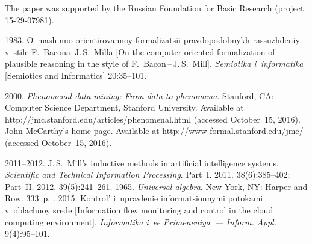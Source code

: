 

\vspace*{-12pt}

\Ack
\noindent
The paper was supported by the Russian Foundation for Basic Research (project 15-29-07981).




  \begin{multicols}{2}

\renewcommand{\bibname}{\protect\rmfamily References}

{\small\frenchspacing
 {%
 \begin{thebibliography}{9}
 
   1983. O~mashinno-orientirovannoy for\-ma\-li\-za\-tsii 
pravdopodobnykh rassuzhdeniy v~stile F.~Bacona--J.\,S.~Milla [On the  
computer-oriented formalization of plausible reasoning in the style of  
F.~Bacon\,--\,J.\,S.~Mill]. \textit{Semiotika i~informatika} [Semiotics and 
Informatics] 20:35--101.


   2000. \textit{Phenomenal data mining: From data to 
phenomena}.  Stanford, CA: Computer Science Department, Stanford University.  
 Available at {\sf 
http://jmc.\linebreak stanford.edu/articles/phenomenal.html} (accessed October~15, 2016). 
   John McCarthy's home page. Available at {\sf 
   http://www-formal.stanford.edu/jmc/} (accessed October~15, 2016). 
  
   2011--2012. J.\,S.~Mill's inductive methods in artificial 
intelligence systems. \textit{Scientific and Technical Information Processing}. 
Part~I. 2011. 38(6):385--402; Part~II. 2012. 39(5):241--261.
   1965. \textit{Universal algebra}.  New York, NY: 
Harper and Row. 333~p.
  . 2015. Kontrol'
i~upravlenie informatsionnymi potokami v~oblachnoy srede [Information flow 
monitoring and control in the cloud computing environment]. \textit{Informatika 
i~ee Primeneniya~--- Inform. Appl.} 9(4):95--101.
  

\end{thebibliography}}}
\end{multicols}
